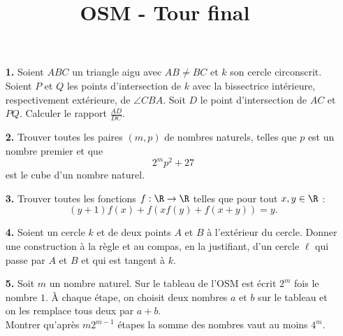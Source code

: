 \documentclass[language=french,style=exam]{smo}
\title{OSM - Tour final}
\begin{document}
\begin{enumerate}

\item[\textbf{1.}] Soient $ABC$ un triangle aigu avec $AB\neq BC$ et $k$ son cercle circonscrit. Soient $P$ et $Q$ les points d'intersection de $k$ avec la bissectrice intérieure, respectivement extérieure, de $\angle CBA$. Soit $D$ le point d'intersection de $AC$ et $PQ$. Calculer le rapport $\frac{AD}{DC}$.

\bigskip

\item[\textbf{2.}] Trouver toutes les paires $(m,p)$ de nombres naturels, telles que $p$ est un nombre premier et que
\[2^mp^2+27 \]
est le cube d'un nombre naturel.

\bigskip

\item[\textbf{3.}] Trouver toutes les fonctions $f: \R \rightarrow \R$ telles que pour tout $x,y \in \R$ :
\[
(y+1)f(x) + f(xf(y)+f(x+y))=y.
\]

\bigskip

\item[\textbf{4.}] Soient un cercle $k$ et de deux points $A$ et $B$ à l'extérieur du cercle. Donner une construction à la règle et au compas, en la justifiant, d'un cercle $\ell$ qui passe par $A$ et $B$ et qui est tangent à $k$.

\bigskip

\item[\textbf{5.}] Soit $m$ un nombre naturel. Sur le tableau de l'OSM est écrit $2^m$ fois le nombre $1$. À chaque étape, on choisit deux nombres $a$ et $b$ sur le tableau et on les remplace tous deux par $a+b$.\\
Montrer qu'après $m2^{m-1}$ étapes la somme des nombres vaut au moins $4^m$.

\bigskip

\end{enumerate}

\vspace{1cm}

\end{document}
